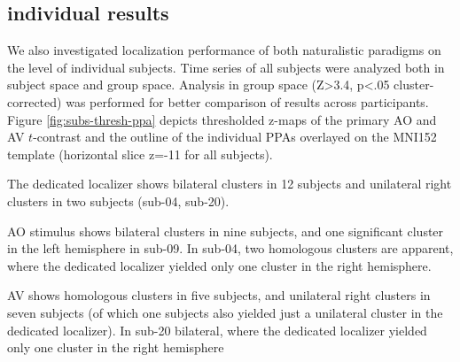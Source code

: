 \documentclass[english]{article}
\begin{document}
\subsection{individual results}
We also investigated localization performance of both naturalistic paradigms on
the level of individual subjects. 
Time series of all subjects were analyzed both in subject space and group space.
Analysis in group space (Z>3.4, p<.05 cluster-corrected) was performed for
better comparison of results across participants.
Figure \ref{fig:subs-thresh-ppa} depicts thresholded z-maps of the primary AO
and AV $t$-contrast and the outline of the individual PPAs
\citep{sengupta2016extension} overlayed on the MNI152 template (horizontal slice
z=-11 for all subjects).


The dedicated localizer shows bilateral clusters in 12 subjects and unilateral
right clusters in two subjects (sub-04, sub-20).

AO stimulus shows bilateral clusters in nine subjects, and one significant cluster in the
left hemisphere in sub-09.
In sub-04, two homologous clusters are apparent, where the dedicated localizer
yielded only one cluster in the right hemisphere.

AV shows homologous clusters in five subjects, and unilateral right clusters in
seven subjects (of which one subjects also yielded just a unilateral cluster in
the dedicated localizer).
In sub-20 bilateral, where the dedicated localizer yielded only one cluster in
the right hemisphere
\end{document}
